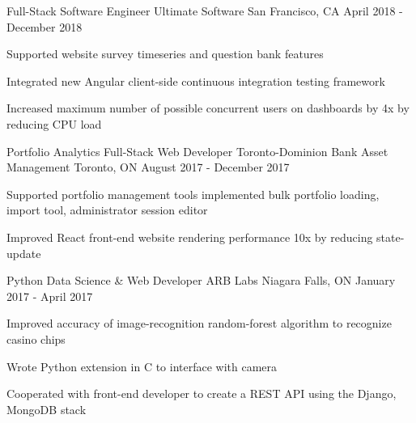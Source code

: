 

\addvspace{1ex}

\begin{cventries}

\cventry
{Full-Stack Software Engineer} %
{Ultimate Software} %
{San Francisco, CA} %
{April 2018 - December 2018} %
{ %
\begin{cvitems}
\item {Supported website survey timeseries and question bank features}
\item {Integrated new Angular client-side continuous integration testing framework}
\item {Increased maximum number of possible concurrent users on dashboards by 4x by reducing CPU load}
\end{cvitems}
}

\cventry
{Portfolio Analytics Full-Stack Web Developer} %
{Toronto-Dominion Bank Asset Management} %
{Toronto, ON} %
{August 2017 - December 2017} %
{ %
\begin{cvitems}
\item {Supported portfolio management tools implemented bulk portfolio loading, import tool, administrator session editor}
\item {Improved React front-end website rendering performance 10x by reducing state-update}
\end{cvitems}
}


\cventry
{Python Data Science \& Web Developer} %
{ARB Labs} %
{Niagara Falls, ON} %
{January 2017 - April 2017} %
{ %
\begin{cvitems}
\item {Improved accuracy of image-recognition random-forest algorithm to recognize casino chips}
\item {Wrote Python extension in C to interface with camera}
\item {Cooperated with front-end developer to create a REST API using the Django, MongoDB stack}
\end{cvitems}
}


\end{cventries}
